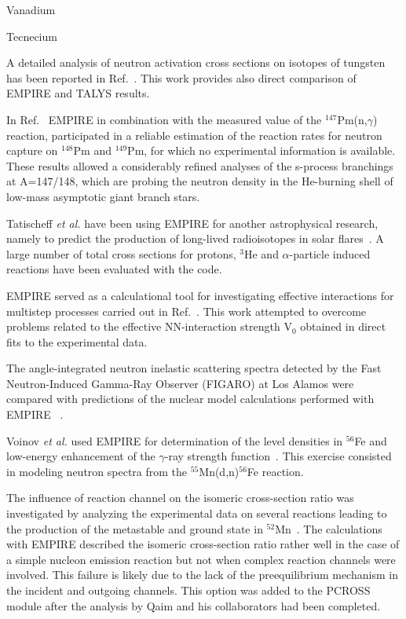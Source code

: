 Vanadium~\cite{Rochman:06b}

Tecnecium~\cite{Rochman:07c}

A detailed analysis of neutron activation cross sections on isotopes of
tungsten has been reported in Ref.~\cite{Avrigeanu:06}. This work provides
also direct comparison of EMPIRE and TALYS results.

In Ref.~\cite{reifarth2003snc} EMPIRE in combination with the measured value
of the $^{147}$Pm(n,$\gamma$) reaction, participated in a reliable
estimation of the reaction rates for neutron capture on $^{148}$Pm and $%
^{149}$Pm, for which no experimental information is available. These results
allowed a considerably refined analyses of the s-process branchings at
A=147/148, which are probing the neutron density in the He-burning shell of
low-mass asymptotic giant branch stars.

Tatischeff \textit{et al.} have been using EMPIRE for another astrophysical
research, namely to predict the production of long-lived radioisotopes in
solar flares~\cite{Tatischeff:06}. A large number of total cross sections
for protons, $^3$He and $\alpha$-particle induced reactions have been
evaluated with the code.

EMPIRE served as a calculational tool for investigating effective
interactions for multistep processes carried out in Ref.~\cite%
{avrigeanu2001eim}. This work attempted to overcome problems related to the
effective NN-interaction strength V$_0$ obtained in direct fits to the
experimental data.

The angle-integrated neutron inelastic scattering spectra detected by the
Fast Neutron-Induced Gamma-Ray Observer (FIGARO) at Los Alamos were compared
with predictions of the nuclear model calculations performed with EMPIRE~%
\cite{rochman2004nir}.

Voinov \textit{et al.} used EMPIRE for determination of the level densities
in $^{56}$Fe and low-energy enhancement of the $\gamma$-ray strength
function~\cite{Voinov:06}. This exercise consisted in modeling neutron
spectra from the $^{55}$Mn(d,n)$^{56}$Fe reaction.

The influence of reaction channel on the isomeric cross-section ratio was
investigated by analyzing the experimental data on several reactions leading
to the production of the metastable and ground state in $^{52}$Mn~\cite%
{Qaim:05}. The calculations with EMPIRE described the isomeric cross-section
ratio rather well in the case of a simple nucleon emission reaction but not
when complex reaction channels were involved. This failure is likely due to
the lack of the preequilibrium mechanism in the incident and outgoing
channels. This option was added to the PCROSS module after the analysis by
Qaim and his collaborators had been completed.

